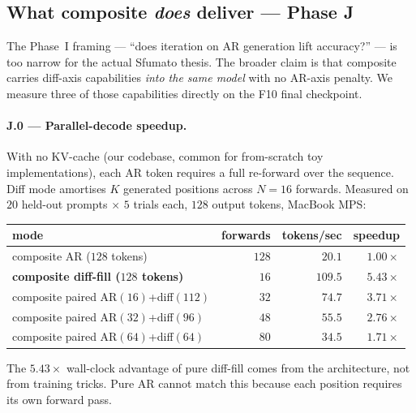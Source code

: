 \subsection{What composite \emph{does} deliver — Phase J}
\label{sec:phase-j}

The Phase~I framing — ``does iteration on AR generation lift
accuracy?'' — is too narrow for the actual Sfumato thesis. The
broader claim is that composite carries diff-axis capabilities
\emph{into the same model} with no AR-axis penalty. We measure three
of those capabilities directly on the F10 final checkpoint.

\paragraph{J.0 — Parallel-decode speedup.}
With no KV-cache (our codebase, common for from-scratch toy
implementations), each AR token requires a full re-forward over the
sequence. Diff mode amortises $K$ generated positions across
$N{=}16$ forwards. Measured on $20$ held-out prompts $\times$ $5$
trials each, $128$ output tokens, MacBook MPS:

\begin{center}
\begin{tabular}{lrrr}
\toprule
mode & forwards & tokens/sec & speedup \\
\midrule
composite AR ($128$ tokens) & $128$ & $20.1$ & $1.00\times$ \\
\textbf{composite diff-fill ($128$ tokens)} & $16$ & $\mathbf{109.5}$ & $\mathbf{5.43\times}$ \\
composite paired AR$(16)$+diff$(112)$ & $32$ & $74.7$ & $3.71\times$ \\
composite paired AR$(32)$+diff$(96)$ & $48$ & $55.5$ & $2.76\times$ \\
composite paired AR$(64)$+diff$(64)$ & $80$ & $34.5$ & $1.71\times$ \\
\bottomrule
\end{tabular}
\end{center}

The $5.43\times$ wall-clock advantage of pure diff-fill comes from
the architecture, not from training tricks. Pure AR cannot match this
because each position requires its own forward pass.

